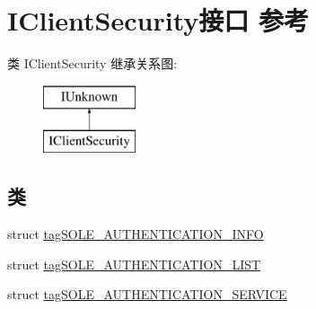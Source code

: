 \hypertarget{interface_i_client_security}{}\section{I\+Client\+Security接口 参考}
\label{interface_i_client_security}
类 I\+Client\+Security 继承关系图\+:\begin{figure}[H]
\begin{center}
\leavevmode
\includegraphics[height=2.000000cm]{interface_i_client_security}
\end{center}
\end{figure}
\subsection*{类}
\begin{DoxyCompactItemize}
\item 
struct \hyperlink{struct_i_client_security_1_1tag_s_o_l_e___a_u_t_h_e_n_t_i_c_a_t_i_o_n___i_n_f_o}{tag\+S\+O\+L\+E\+\_\+\+A\+U\+T\+H\+E\+N\+T\+I\+C\+A\+T\+I\+O\+N\+\_\+\+I\+N\+FO}
\item 
struct \hyperlink{struct_i_client_security_1_1tag_s_o_l_e___a_u_t_h_e_n_t_i_c_a_t_i_o_n___l_i_s_t}{tag\+S\+O\+L\+E\+\_\+\+A\+U\+T\+H\+E\+N\+T\+I\+C\+A\+T\+I\+O\+N\+\_\+\+L\+I\+ST}
\item 
struct \hyperlink{struct_i_client_security_1_1tag_s_o_l_e___a_u_t_h_e_n_t_i_c_a_t_i_o_n___s_e_r_v_i_c_e}{tag\+S\+O\+L\+E\+\_\+\+A\+U\+T\+H\+E\+N\+T\+I\+C\+A\+T\+I\+O\+N\+\_\+\+S\+E\+R\+V\+I\+CE}
\end{DoxyCompactItemize}
